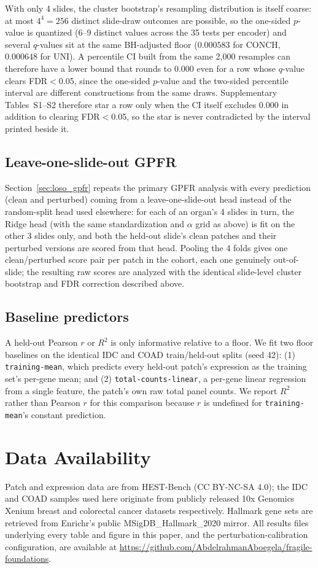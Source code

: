 \documentclass[11pt]{article}
\begin{document}
With only 4 slides, the cluster bootstrap's resampling distribution is itself coarse: at most $4^4=256$ distinct slide-draw outcomes are possible, so the one-sided $p$-value is quantized (6--9 distinct values across the 35 tests per encoder) and several $q$-values sit at the same BH-adjusted floor ($0.000583$ for CONCH, $0.000648$ for UNI). A percentile CI built from the same 2{,}000 resamples can therefore have a lower bound that rounds to $0.000$ even for a row whose $q$-value clears FDR$<$0.05, since the one-sided $p$-value and the two-sided percentile interval are different constructions from the same draws. Supplementary Tables~S1--S2 therefore star a row only when the CI itself excludes 0.000 in addition to clearing FDR$<$0.05, so the star is never contradicted by the interval printed beside it.

\subsection{Leave-one-slide-out GPFR}
Section~\ref{sec:loso_gpfr} repeats the primary GPFR analysis with every prediction (clean and perturbed) coming from a leave-one-slide-out head instead of the random-split head used elsewhere: for each of an organ's 4 slides in turn, the Ridge head (with the same standardization and $\alpha$ grid as above) is fit on the other 3 slides only, and both the held-out slide's clean patches and their perturbed versions are scored from that head. Pooling the 4 folds gives one clean/perturbed score pair per patch in the cohort, each one genuinely out-of-slide; the resulting raw scores are analyzed with the identical slide-level cluster bootstrap and FDR correction described above.

\subsection{Baseline predictors}
A held-out Pearson $r$ or $R^2$ is only informative relative to a floor. We fit two floor baselines on the identical IDC and COAD train/held-out splits (seed 42): (1) \texttt{training-mean}, which predicts every held-out patch's expression as the training set's per-gene mean; and (2) \texttt{total-counts-linear}, a per-gene linear regression from a single feature, the patch's own raw total panel counts. We report $R^2$ rather than Pearson $r$ for this comparison because $r$ is undefined for \texttt{training-mean}'s constant prediction.

\section*{Data Availability}
Patch and expression data are from HEST-Bench \citep{hest1k_2024} (CC BY-NC-SA 4.0); the IDC and COAD samples used here originate from publicly released 10x Genomics Xenium breast and colorectal cancer datasets respectively. Hallmark gene sets are retrieved from Enrichr's public MSigDB\_Hallmark\_2020 mirror. All results files underlying every table and figure in this paper, and the perturbation-calibration configuration, are available at \url{https://github.com/AbdelrahmanAboegela/fragile-foundations}.
\end{document}
